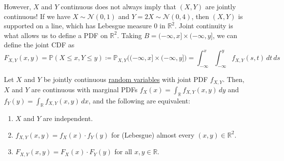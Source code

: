 	However, $X$ and $Y$ continuous does not always imply that $(X, Y)$ are jointly continuous! If we have $X \sim \mathcal{N}(0, 1)$ and $Y = 2 X \sim \mathcal{N}(0, 4)$, then $(X, Y)$ is supported on a line, which has Lebesgue measure $0$ in $\mathbb{R}^2$. Joint continuity is what allows us to define a PDF on $\mathbb{R}^2$. Taking $B = (-\infty, x] \times (-\infty, y]$, we can define the joint CDF as 
	\begin{equation}
		F_{X, Y} (x, y) = \mathbb{P}(X \leq x, Y \leq y) \coloneqq \mathbb{P}_{X, Y} \big( (-\infty, x] \times (-\infty, y] \bigg) = \int_{-\infty}^x \int_{-\infty}^y f_{X, Y} (s, t) \, dt \,ds
	\end{equation}

	\begin{theorem}
	  \label{thm:independence-of-continuous-random-variables}
		Let $X$ and $Y$ be jointly continuous \hyperref[def:random-variable]{random variables} with joint PDF $f_{X, Y}$. Then, $X$ and $Y$ are continuous with marginal PDFs $f_X (x) = \int_{\mathbb{R}} f_{X, Y} (x, y) \,dy$ and $f_Y (y) = \int_{\mathbb{R}} f_{X, Y} (x, y) \,dx$, and the following are equivalent: 
		\begin{enumerate}
			\item $X$ and $Y$ are independent. 
			\item $f_{X, Y} (x, y) = f_X (x) \cdot f_Y (y)$ for (Lebesgue) almost every $(x, y) \in \mathbb{R}^2$. 
			\item $F_{X, Y} (x, y) = F_X (x) \cdot F_Y (y)$ for all $x, y \in \mathbb{R}$. 
		\end{enumerate}
	\end{theorem}
